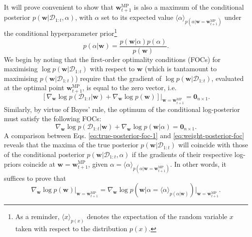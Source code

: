 It will prove convenient to show that $\mathbf{w}_{t+1}^\text{MP}$ is also a maximum of the conditional posterior $p(\mathbf{w}|\mathcal{D}_{1:t}, \alpha)$, with $\alpha$ set to its expected value $\langle\alpha\rangle_{p(\alpha|\mathbf{w}=\mathbf{w}_{t+1}^\text{MP})}$ under the conditional hyperparameter prior\footnote{As a reminder, $\langle x\rangle_{p(x)}$ denotes the expectation of the random variable $x$ taken with respect to the distribution $p(x)$.}
\begin{equation}
\label{eq:conditional-hyperparameter-dist}
	p(\alpha|\mathbf{w})
	= \frac{p(\mathbf{w}|\alpha)p(\alpha)}{p(\mathbf{w})}.
\end{equation}
We begin by noting that the first-order optimality conditions (FOCs) for maximising $\log p(\mathbf{w}|\mathcal{D}_{1:t})$ with respect to $\mathbf{w}$ (which is tantamount to maximising $p(\mathbf{w}|\mathcal{D}_{1:t})$) require that the gradient of $\log p(\mathbf{w}|\mathcal{D}_{1:t})$, evaluated at the optimal point $\mathbf{w}_{t+1}^\text{MP}$, is equal to the zero vector, i.e.\
\begin{equation}
\label{eq:true-posterior-foc-1}
	[\nabla_{\mathbf{w}} \log p(\mathcal{D}_{1:t}|\mathbf{w}) + \nabla_{\mathbf{w}} \log p(\mathbf{w})]\big|_{\mathbf{w}=\mathbf{w}_{t+1}^\text{MP}} = \mathbf{0}_{n\times 1}.
\end{equation}
Similarly, by virtue of Bayes' rule, the optimum of the conditional log-posterior must satisfy the following FOCs:
\begin{equation}
\label{eq:weight-posterior-foc}
	\nabla_{\mathbf{w}}\log p(\mathcal{D}_{1:t}|\mathbf{w}) + \nabla_{\mathbf{w}}\log p(\mathbf{w}|\alpha) = \mathbf{0}_{n\times 1}.
\end{equation}
A comparison between Eqs. \eqref{eq:true-posterior-foc-1} and \eqref{eq:weight-posterior-foc} reveals that the maxima of the true posterior $p(\mathbf{w}|\mathcal{D}_{1:t})$ will coincide with those of the conditional posterior $p(\mathbf{w}|\mathcal{D}_{1:t}, \alpha)$ if the gradients of their respective log-priors coincide at $\mathbf{w} = \mathbf{w}_{t+1}^\text{MP}$, given $\alpha = \langle\alpha\rangle_{p(\alpha|\mathbf{w}=\mathbf{w}_{t+1}^\text{MP})}$. In other words, it suffices to prove that
\begin{equation}
	\nabla_{\mathbf{w}} \log p(\mathbf{w})\big|_{\mathbf{w}=\mathbf{w}_{t+1}^\text{MP}}
	= \nabla_{\mathbf{w}}\log p(\mathbf{w}|\alpha = \langle\alpha\rangle_{p(\alpha|\mathbf{w})})\big|_{\mathbf{w}=\mathbf{w}_{t+1}^\text{MP}}.
\end{equation}

